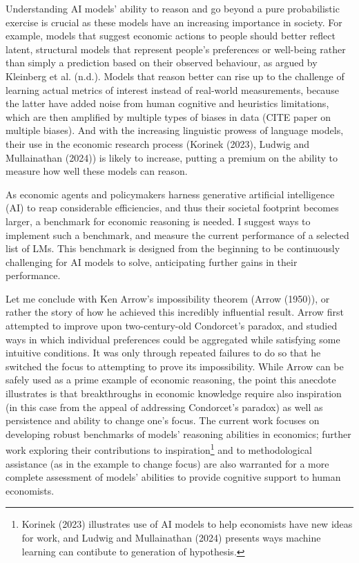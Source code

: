 \documentclass[
]{article}
\theoremstyle{plain}
\theoremstyle{definition}
\theoremstyle{remark}
\begin{document}
Understanding AI models' ability to reason and go beyond a pure
probabilistic exercise is crucial as these models have an increasing
importance in society. For example, models that suggest economic actions
to people should better reflect latent, structural models that represent
people's preferences or well-being rather than simply a prediction based
on their observed behaviour, as argued by Kleinberg et al. (n.d.).
Models that reason better can rise up to the challenge of learning
actual metrics of interest instead of real-world measurements, because
the latter have added noise from human cognitive and heuristics
limitations, which are then amplified by multiple types of biases in
data (CITE paper on multiple biases). And with the increasing linguistic
prowess of language models, their use in the economic research process
(Korinek (2023), Ludwig and Mullainathan (2024)) is likely to increase,
putting a premium on the ability to measure how well these models can
reason.

As economic agents and policymakers harness generative artificial
intelligence (AI) to reap considerable efficiencies, and thus their
societal footprint becomes larger, a benchmark for economic reasoning is
needed. I suggest ways to implement such a benchmark, and measure the
current performance of a selected list of LMs. This benchmark is
designed from the beginning to be continuously challenging for AI models
to solve, anticipating further gains in their performance.

Let me conclude with Ken Arrow's impossibility theorem (Arrow (1950)),
or rather the story of how he achieved this incredibly influential
result. Arrow first attempted to improve upon two-century-old
Condorcet's paradox, and studied ways in which individual preferences
could be aggregated while satisfying some intuitive conditions. It was
only through repeated failures to do so that he switched the focus to
attempting to prove its impossibility. While Arrow can be safely used as
a prime example of economic reasoning, the point this anecdote
illustrates is that breakthroughs in economic knowledge require also
inspiration (in this case from the appeal of addressing Condorcet's
paradox) as well as persistence and ability to change one's focus. The
current work focuses on developing robust benchmarks of models'
reasoning abilities in economics; further work exploring their
contributions to inspiration\footnote{Korinek (2023) illustrates use of
  AI models to help economists have new ideas for work, and Ludwig and
  Mullainathan (2024) presents ways machine learning can contibute to
  generation of hypothesis.} and to methodological assistance (as in the
example to change focus) are also warranted for a more complete
assessment of models' abilities to provide cognitive support to human
economists.
\end{document}
